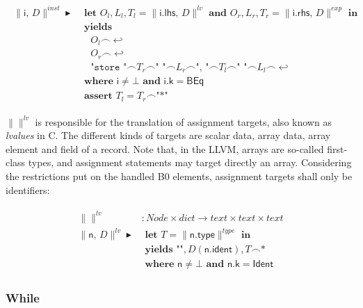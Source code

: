 \documentclass{article}
\newcommand{\trad}[2]{\ensuremath{\lVert \textsf{#1} \rVert^{\textit{#2}}}}
\newcommand{\nl}[0]{\ensuremath{\hookleftarrow}}
\DeclareMathOperator{\conc}{\smallfrown}
\DeclareMathOperator{\isdef}{\blacktriangleright}
\begin{document}
\begin{framed}
\begin{align}
\begin{split}
  \trad{i, $D$}{inst} \isdef 
  & \textbf{ let } O_l, L_l, T_l = \trad{i.lhs, $D$}{lv} \textbf{ and } O_r, L_r, T_r = \trad{i.rhs, $D$}{exp}  \textbf{ in} \\
  & \textbf{ yields }  \\
  & \quad O_l \conc \nl  \\
  & \quad O_r \conc \nl  \\
  & \quad \texttt{"store "} \conc T_r \conc \texttt{" "} \conc L_r \conc \texttt{", "}
  \conc T_l \conc \texttt{" "} \conc L_l \conc \nl  \\
  & \textbf{ where } \textsf{i} \ne \bot \textbf{ and } \textsf{i.k} = \textsf{BEq}  \\
  & \textbf{ assert } T_l = T_r \conc \texttt{"*"} 
\end{split}
\end{align}
\end{framed}

$\trad{}{lv}$ is responsible for the translation of assignment
targets, also known as \emph{lvalues} in C. The different kinds of
targets are scalar data, array data, array element and field of a
record. Note that, in the LLVM, arrays are so-called first-class
types, and assignment statements may target directly an
array. Considering the restrictions put on the handled B0 elements,
assignment targets shall only be identifiers:

\begin{framed}
\begin{align}
\begin{split}
  \trad{}{lv} &: Node \times dict \rightarrow text \times text \times text \\
  \trad{n, $D$}{lv} \isdef 
  & \textbf{ let } T = \trad{n.type}{type} \textbf{ in }  \\
  & \textbf{ yields } \texttt{""}, D(\textsf{n.ident}), T \conc \texttt{*} \\
  & \textbf{ where } \textsf{n} \ne \bot \textbf{ and } \textsf{n.k} = \textsf{Ident}
\end{split}
\end{align}
\end{framed}

\subsubsection{While}
\end{document}
